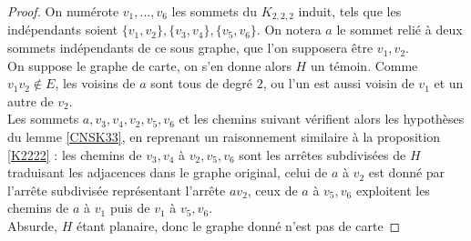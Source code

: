 \documentclass{scrartcl}
\begin{document}
\begin{flushleft}
\begin{proof}
    On numérote $v_1, ..., v_6$ les sommets du $K_{2,2,2}$ induit, tels que les indépendants soient $\{v_1, v_2\}, \{v_3,v_4\}, \{v_5,v_6\}$.
    On notera $a$ le sommet relié à deux sommets indépendants de ce sous graphe, que l'on supposera être $v_1, v_2$.\\
    On suppose le graphe de carte, on s'en donne alors $H$ un témoin. Comme $v_1v_2 \notin E$, les voisins de $a$ sont tous de degré
    $2$, ou l'un est aussi voisin de $v_1$ et un autre de $v_2$.\\
    Les sommets $a, v_3, v_4, v_2, v_5, v_6$ et les chemins suivant vérifient alors les hypothèses du lemme \ref{CNSK33}, en reprenant un raisonnement
    similaire à la proposition \ref{K2222} : les chemins de $v_3, v_4$ à $v_2, v_5, v_6$ sont les arrêtes subdivisées de $H$
    traduisant les adjacences dans le graphe original, celui de $a$ à $v_2$ est donné par l'arrête subdivisée représentant l'arrête $av_2$,
    ceux de $a$ à $v_5, v_6$ exploitent les chemins de $a$ à $v_1$ puis de $v_1$ à $v_5, v_6$.\\
    Absurde, $H$ étant planaire, donc le graphe donné n'est pas de carte
\end{proof}


\end{flushleft}
\end{document}

